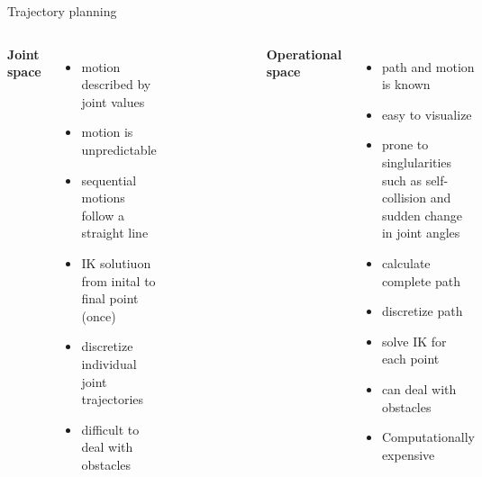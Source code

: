 \documentclass[de]{sdqbeamer}
\begin{document}

\begin{frame}{Trajectory planning}
    \begin{columns}[t]
        \textbf{Joint space}
        \begin{itemize}
            \item motion described by joint values
            \item motion is unpredictable
            \item sequential motions follow a straight line
            \item IK solutiuon from inital to final point (once)
            \item discretize individual joint trajectories
            \item difficult to deal with obstacles
        \end{itemize}        
        \begin{figure}
            \centering
            \includegraphics[scale=0.15]{graphics/trajectory.png}
        \end{figure}
        \textbf{Operational space}
        \begin{itemize}
            \item path and motion is known
            \item easy to visualize
            \item prone to singlularities such as self-collision and sudden change in joint angles
            \item calculate complete path
            \item discretize path
            \item solve IK for each point
            \item can deal with obstacles
            \item Computationally expensive
        \end{itemize}
    \end{columns}   
\end{frame}
\end{document}
